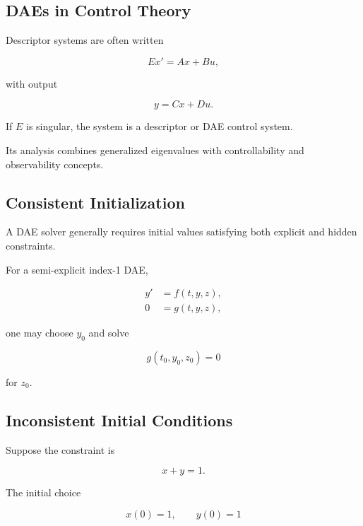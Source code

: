 \subsection{DAEs in Control Theory}
\label{subsec:dae-control-theory}

Descriptor systems are often written

\[
\boxed{
E x'
=
Ax+Bu,
}
\]

with output

\[
\boxed{
y=Cx+Du.
}
\]

If \(E\) is singular, the system is a descriptor or DAE control system.

Its analysis combines generalized eigenvalues with controllability and
observability concepts.

\subsection{Consistent Initialization}
\label{subsec:dae-consistent-initialization}

A DAE solver generally requires initial values satisfying both explicit
and hidden constraints.

For a semi-explicit index-1 DAE,

\[
\begin{aligned}
y'&=f(t,y,z),\\
0&=g(t,y,z),
\end{aligned}
\]

one may choose \(y_0\) and solve

\[
\boxed{
g(t_0,y_0,z_0)=0
}
\]

for \(z_0\).

\subsection{Inconsistent Initial Conditions}
\label{subsec:dae-inconsistent-initial-conditions}

Suppose the constraint is

\[
x+y=1.
\]

The initial choice

\[
x(0)=1,
\qquad
y(0)=1
\]

